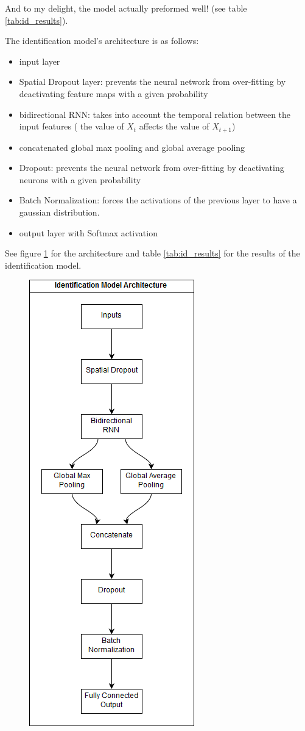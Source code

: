 \documentclass{article}
\begin{document}
And to my delight, the model actually preformed well! (see table \ref{tab:id_results}).

The identification model's architecture is as follows:
\begin{itemize}
    \item input layer 
    \item Spatial Dropout layer: prevents the neural network from over-fitting by deactivating feature maps with a given probability
    \item bidirectional RNN: takes into account the temporal relation between the input features ( the value of $X_t$ affects the value of $X_{t+1}$)
    \item concatenated global max pooling and global average pooling
    \item Dropout:  prevents the neural network from over-fitting by deactivating neurons with a given probability
    \item Batch Normalization: forces the activations of the previous layer to have a gaussian distribution.
    \item output layer with Softmax activation
\end{itemize}
See figure \ref{fig:id_arch} for the architecture and table \ref{tab:id_results} for the results of the identification model.
\begin{figure}[H]
    \centering
    \includegraphics[scale=.65]{images/id_model.png}
    \caption{}
    \label{fig:id_arch}
\end{figure}
\end{document}
